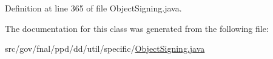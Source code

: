 Definition at line 365 of file Object\-Signing.\-java.



The documentation for this class was generated from the following file\-:\begin{DoxyCompactItemize}
\item 
src/gov/fnal/ppd/dd/util/specific/\hyperlink{ObjectSigning_8java}{Object\-Signing.\-java}\end{DoxyCompactItemize}
